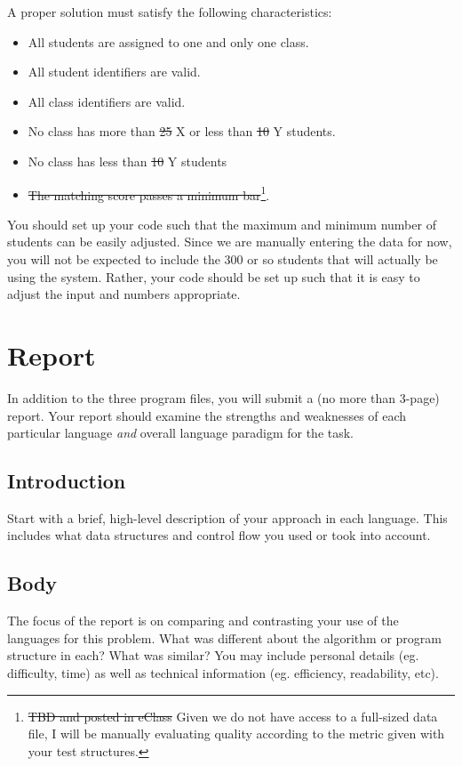 \documentclass[12pt,info]{asg}
\begin{document}
A proper solution must satisfy the following characteristics:
\begin{itemize}
\item All students are assigned to one and only one class.
\item All student identifiers are valid.
\item All class identifiers are valid.
\item No class has more than \sout{25} X or less than \sout{10} Y students.
\item No class has less than \sout{10} Y students
\item \sout{The matching score passes a minimum bar}\footnote{\sout{TBD and posted in eClass}
Given we do not have access to a full-sized data file, I will be manually evaluating quality according to the metric given with your test structures.
}.
\end{itemize}

You should set up your code such that the maximum and minimum number of students can be easily adjusted. Since we are manually entering the data for now, you will not be expected to include the 300 or so students that will actually be using the system. Rather, your code should be set up such that it is easy to adjust the input and numbers appropriate.

\section*{Report}

In addition to the three program files, you will submit a (no more than 3-page) report. Your report should examine the strengths and weaknesses of each particular language {\em and} overall language paradigm for the task. 

\subsection*{Introduction}
Start with a brief, high-level description of your approach in each language. This includes what data structures and control flow you used or took into account.

\subsection*{Body}
The focus of the report is on comparing and contrasting your use of the languages for this problem. What was different about the algorithm or program structure in each? What was similar? You may include personal details (eg. difficulty, time) as well as technical information (eg. efficiency, readability, etc).
\end{document}
